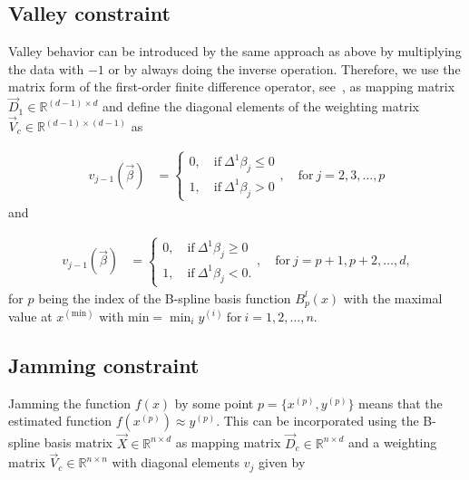 \subsection{Valley constraint} \label{subsec:ValleyC}

Valley behavior can be introduced by the same approach as above by multiplying the data with $-1$ or by always doing the inverse operation. Therefore, we use the matrix form of the first-order finite difference operator, see~, as mapping matrix $\vec{D}_1 \in \mathbb{R}^{(d-1) \times d}$ and define the diagonal elements of the weighting matrix $\vec{V}_c \in \mathbb{R}^{(d-1) \times (d-1)}$ as

\begin{align}\label{eq:v_valley_1}
	v_{j-1}(\vec{\beta}) &= \begin{cases} 
		0, \quad \text{if} \ \Delta^1\beta_j \le 0 \\ 
		1, \quad \text{if} \ \Delta^1\beta_j > 0
	\end{cases}, \quad \text{for} \ j=2,3,\dots,p
\end{align}
%
and 

\begin{align}\label{eq:v_valley_2}
	v_{j-1}(\vec{\beta}) &= \begin{cases} 
		0, \quad \text{if} \ \Delta^1\beta_j \ge 0 \\ 
		1, \quad \text{if} \ \Delta^1\beta_j < 0.
	\end{cases}, \quad \text{for} \  j=p+1,p+2,\dots,d,
\end{align}
%
for $p$ being the index of the B-spline basis function $B_p^l(x)$ with the maximal value at $x^{(\text{min})}$ with $\text{min} = \min_i y^{(i)} \ \text{for} \ i=1,2,\dots,n$. 

\subsection{Jamming constraint} \label{subsec:JammC}

Jamming the function $f(x)$ by some point $p = \{x^{(p)}, y^{(p)}\}$ means that the estimated function $f(x^{(p)}) \approx y^{(p)}$. This can be incorporated using the B-spline basis matrix $\vec{X} \in \mathbb{R}^{n \times d}$ as mapping matrix $\vec{D}_c \in \mathbb{R}^{n \times d}$ and a weighting matrix $\vec{V}_c \in \mathbb{R}^{n \times n}$ with diagonal elements $v_j$ given by

